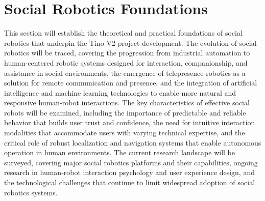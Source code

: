 \section{Social Robotics Foundations}
This section will establish the theoretical and practical foundations of social robotics that underpin the Tino V2 project development. The evolution of social robotics will be traced, covering the progression from industrial automation to human-centered robotic systems designed for interaction, companionship, and assistance in social environments, the emergence of telepresence robotics as a solution for remote communication and presence, and the integration of artificial intelligence and machine learning technologies to enable more natural and responsive human-robot interactions. The key characteristics of effective social robots will be examined, including the importance of predictable and reliable behavior that builds user trust and confidence, the need for intuitive interaction modalities that accommodate users with varying technical expertise, and the critical role of robust localization and navigation systems that enable autonomous operation in human environments. The current research landscape will be surveyed, covering major social robotics platforms and their capabilities, ongoing research in human-robot interaction psychology and user experience design, and the technological challenges that continue to limit widespread adoption of social robotics systems.

